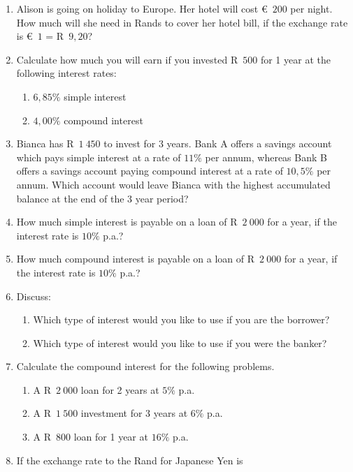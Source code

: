 \begin{eocexercises}{}
    \begin{enumerate}[label=\textbf{\arabic*}.]
	\item Alison is going on holiday to Europe. Her hotel will cost €~$200$ per night. How much will she need in Rands to cover her hotel bill, if the exchange rate is €~$1$ = R~$9,20$?
	\item Calculate how much you will earn if you invested R~$500$ for 1 year at the following interest rates:
	\begin{enumerate}[noitemsep, label=\textbf{(\alph*)} ]
	    \item $6,85\%$ simple interest
	    \item $4,00\%$ compound interest
	\end{enumerate}
	\item Bianca has R~$1~450$ to invest for 3 years. Bank A offers a savings account which pays simple interest at a rate of $11\%$ per annum, whereas Bank B offers a savings account paying compound interest at a rate of $10,5\%$ per annum. Which account would leave Bianca with the highest accumulated balance at the end of the 3 year period?
	\item How much simple interest is payable on a loan of R~$2~000$ for a year, if the interest rate is $10\%$ p.a.?
	\item How much compound interest is payable on a loan of R~$2~000$ for a year, if the interest rate is $10\%$ p.a.?
	\item Discuss:
	\begin{enumerate}[noitemsep, label=\textbf{(\alph*)} ]
	    \item Which type of interest would you like to use if you are the borrower?
	    \item Which type of interest would you like to use if you were the banker?
	\end{enumerate}
	\item Calculate the compound interest for the following problems.
	\begin{enumerate}[noitemsep, label=\textbf{(\alph*)} ]
	    \item A R~$2~000$ loan for 2 years at $5\%$ p.a.
	    \item A R~$1~500$ investment for 3 years at $6\%$ p.a.
	    \item A R~$800$ loan for 1 year at $16\%$ p.a.
	\end{enumerate}
	\item If the exchange rate to the Rand for Japanese Yen is

\end{enumerate}
\end{eocexercises}
